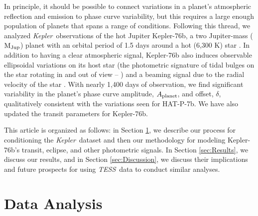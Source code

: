 \documentclass[manuscript]{aastex62}
\newcommand{\kepler}{{\it Kepler}}
\newcommand{\tess}{{\it TESS}}
\begin{document}
In principle, it should be possible to connect variations in a planet's atmospheric reflection and emission to phase curve variability, but this requires a large enough population of planets that spans a range of conditions. Following this thread, we analyzed \kepler\ observations of the hot Jupiter Kepler-76b, a two Jupiter-mass (${\rm M_{Jup}}$) planet with an orbital period of 1.5 days around a hot (6,300 K) star \citep{2013ApJ...771...26F}. In addition to having a clear atmospheric signal, Kepler-76b also induces observable ellipsoidal variations on its host star (the photometric signature of tidal bulges on the star rotating in and out of view -- \citealp{2010ApJ...713L.145W}) and a beaming signal due to the radial velocity of the star \citep{2003ApJ...588L.117L}. With nearly 1,400 days of observation, we find significant variability in the planet's phase curve amplitude, $A_{\rm planet}$, and offset, $\delta$, qualitatively consistent with the variations seen for HAT-P-7b. We have also updated the transit parameters for Kepler-76b.

This article is organized as follows: in Section \ref{sec:Data_Analysis}, we describe our process for conditioning the \kepler\ dataset and then our methodology for modeling Kepler-76b's transit, eclipse, and other photometric signals. In Section \ref{sec:Results}, we discuss our results, and in Section \ref{sec:Discussion}, we discuss their implications and future prospects for using \tess\ data to conduct similar analyses.

\section{Data Analysis}
\label{sec:Data_Analysis}
\end{document}
